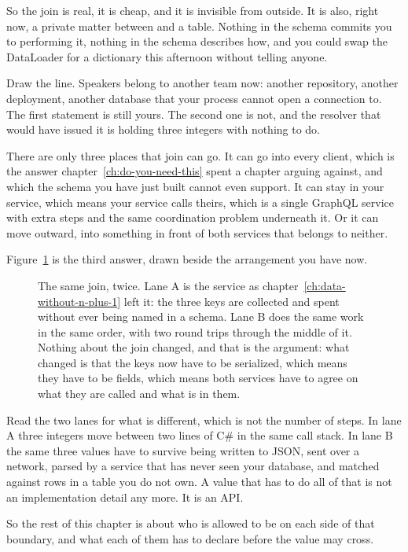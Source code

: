 %
So the join is real, it is cheap, and it is invisible from outside. It is also,
right now, a private matter between  and a table. Nothing
in the schema commits you to performing it, nothing in the schema describes
how, and you could swap the DataLoader for a dictionary this afternoon without
telling anyone.

%
Draw the line. Speakers belong to another team now: another repository, another
deployment, another database that your process cannot open a connection to.
The first statement is still yours. The second one is not, and the resolver
that would have issued it is holding three integers with nothing to do.

%
There are only three places that join can go. It can go into every client,
which is the answer chapter~\ref{ch:do-you-need-this} spent a chapter arguing
against, and which the schema you have just built cannot even support. It can
stay in your service, which means your service calls theirs, which is a single
GraphQL service with extra steps and the same coordination problem underneath
it. Or it can move outward, into something in front of both services that
belongs to neither.

Figure~\ref{fig:ch05-the-join-moves} is the third answer, drawn beside the
arrangement you have now.

\begin{figure}
  \centering
  
  \caption{The same join, twice. Lane A is the service as
  chapter~\ref{ch:data-without-n-plus-1} left it: the three keys are collected
  and spent without ever being named in a schema. Lane B does the same work in
  the same order, with two round trips through the middle of it. Nothing about
  the join changed, and that is the argument: what changed is that the keys now
  have to be serialized, which means they have to be fields, which means both
  services have to agree on what they are called and what is in them.}
  \label{fig:ch05-the-join-moves}
\end{figure}

%
Read the two lanes for what is different, which is not the number of steps. In
lane A three integers move between two lines of C\# in the same call stack. In
lane B the same three values have to survive being written to JSON, sent over a
network, parsed by a service that has never seen your database, and matched
against rows in a table you do not own. A value that has to do all of that is
not an implementation detail any more. It is an API.

%
So the rest of this chapter is about who is allowed to be on each side of that
boundary, and what each of them has to declare before the value may cross.
%
